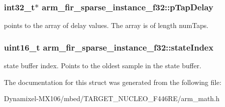 \subsubsection[{\texorpdfstring{p\+Tap\+Delay}{pTapDelay}}]{\setlength{\rightskip}{0pt plus 5cm}int32\+\_\+t$\ast$ arm\+\_\+fir\+\_\+sparse\+\_\+instance\+\_\+f32\+::p\+Tap\+Delay}\hypertarget{structarm__fir__sparse__instance__f32_aaa54ae67e5d10c6dd0d697945c638d31}{}\label{structarm__fir__sparse__instance__f32_aaa54ae67e5d10c6dd0d697945c638d31}
points to the array of delay values. The array is of length num\+Taps. 
\subsubsection[{\texorpdfstring{state\+Index}{stateIndex}}]{\setlength{\rightskip}{0pt plus 5cm}uint16\+\_\+t arm\+\_\+fir\+\_\+sparse\+\_\+instance\+\_\+f32\+::state\+Index}\hypertarget{structarm__fir__sparse__instance__f32_a57585aeca9dc8686e08df2865375a86d}{}\label{structarm__fir__sparse__instance__f32_a57585aeca9dc8686e08df2865375a86d}
state buffer index. Points to the oldest sample in the state buffer. 

The documentation for this struct was generated from the following file\+:\begin{DoxyCompactItemize}
\item 
Dynamixel-\/\+M\+X106/mbed/\+T\+A\+R\+G\+E\+T\+\_\+\+N\+U\+C\+L\+E\+O\+\_\+\+F446\+R\+E/arm\+\_\+math.\+h\end{DoxyCompactItemize}
